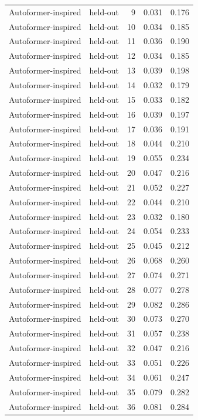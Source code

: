 \begin{tabular}{llrrr}
Autoformer-inspired & held-out & 9 & 0.031 & 0.176 \\
Autoformer-inspired & held-out & 10 & 0.034 & 0.185 \\
Autoformer-inspired & held-out & 11 & 0.036 & 0.190 \\
Autoformer-inspired & held-out & 12 & 0.034 & 0.185 \\
Autoformer-inspired & held-out & 13 & 0.039 & 0.198 \\
Autoformer-inspired & held-out & 14 & 0.032 & 0.179 \\
Autoformer-inspired & held-out & 15 & 0.033 & 0.182 \\
Autoformer-inspired & held-out & 16 & 0.039 & 0.197 \\
Autoformer-inspired & held-out & 17 & 0.036 & 0.191 \\
Autoformer-inspired & held-out & 18 & 0.044 & 0.210 \\
Autoformer-inspired & held-out & 19 & 0.055 & 0.234 \\
Autoformer-inspired & held-out & 20 & 0.047 & 0.216 \\
Autoformer-inspired & held-out & 21 & 0.052 & 0.227 \\
Autoformer-inspired & held-out & 22 & 0.044 & 0.210 \\
Autoformer-inspired & held-out & 23 & 0.032 & 0.180 \\
Autoformer-inspired & held-out & 24 & 0.054 & 0.233 \\
Autoformer-inspired & held-out & 25 & 0.045 & 0.212 \\
Autoformer-inspired & held-out & 26 & 0.068 & 0.260 \\
Autoformer-inspired & held-out & 27 & 0.074 & 0.271 \\
Autoformer-inspired & held-out & 28 & 0.077 & 0.278 \\
Autoformer-inspired & held-out & 29 & 0.082 & 0.286 \\
Autoformer-inspired & held-out & 30 & 0.073 & 0.270 \\
Autoformer-inspired & held-out & 31 & 0.057 & 0.238 \\
Autoformer-inspired & held-out & 32 & 0.047 & 0.216 \\
Autoformer-inspired & held-out & 33 & 0.051 & 0.226 \\
Autoformer-inspired & held-out & 34 & 0.061 & 0.247 \\
Autoformer-inspired & held-out & 35 & 0.079 & 0.282 \\
Autoformer-inspired & held-out & 36 & 0.081 & 0.284 \\

\end{tabular}
